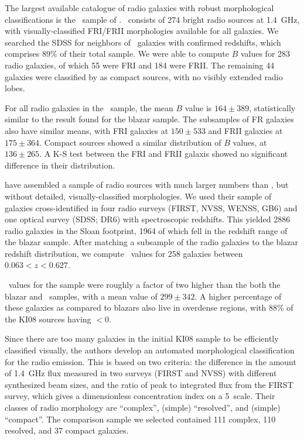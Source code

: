 \documentclass{emulateapj}
\begin{document}
The largest available catalogue of radio galaxies with robust morphological classifications is the \config~sample of \citet{gen08}. \config~consists of 274 bright radio sources at 1.4~GHz, with visually-classified FRI/FRII morphologies available for all galaxies. We searched the SDSS for neighbors of \config~galaxies with confirmed redshifts, which comprises 89\% of their total sample. We were able to compute $B$ values for 283 radio galaxies, of which 55 were FRI and 184 were FRII. The remaining 44 galaxies were classified by \citet{gen08} as compact sources, with no visibly extended radio lobes. 

For all radio galaxies in the \config~sample, the mean $B$ value is $164\pm389$, statistically similar to the result found for the blazar sample. The subsamples of FR galaxies also have similar means, with FRI galaxies at $150\pm533$ and FRII galaxies at $175\pm364$. Compact sources showed a similar distribution of $B$ values, at $136\pm265$. A K-S test between the FRI and FRII galaxis showed no significant difference in their distribution. 

\citet{kim08} have assembled a sample of radio sources with much larger numbers than \config, but without detailed, visually-classified morphologies. We used their sample of galaxies cross-identified in four radio surveys (FIRST, NVSS, WENSS, GB6) and one optical survey (SDSS; DR6) with spectroscopic redshifts. This yielded 2886 radio galaxies in the Sloan footprint, 1964 of which fell in the redshift range of the blazar sample. After matching a subsample of the radio galaxies to the blazar redshift distribution, we compute \bgb~values for 258 galaxies between $0.063<z<0.627$.  

\bgb~values for the \citet{kim08} sample were roughly a factor of two higher than the both the blazar and \config~samples, with a mean value of $299\pm342$. A higher percentage of these galaxies as compared to blazars also live in overdense regions, with 88\% of the KI08 sources having \bgb$<0$. 

Since there are too many galaxies in the initial KI08 sample to be efficiently classified visually, the authors develop an automated morphological classification for the radio emission. This is based on two criteria: the difference in the amount of 1.4~GHz flux measured in two surveys (FIRST and NVSS) with different synthesized beam sizes, and the ratio of peak to integrated flux from the FIRST survey, which gives a dimensionless concentration index on a 5\arcsec~scale. Their classes of radio morphology are ``complex'', (simple) ``resolved'', and (simple) ``compact''. The comparison sample we selected contained 111 complex, 110 resolved, and 37 compact galaxies. 
\end{document}
